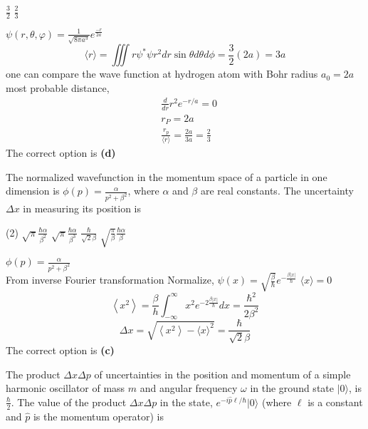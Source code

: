 \begin{enumerate}
\begin{tasks}
	\task[\textbf{C.}]$\frac{3}{2}$
	\task[\textbf{D.}]$\frac{2}{3}$
\end{tasks}
\begin{answer}
	$\psi(r, \theta, \varphi)=\frac{1}{\sqrt{8 \pi a^{3}}} e^{\frac{-r}{2 a}}$\\
	$$
	\langle r\rangle=\iiint r \psi^{*} \psi r^{2} d r \sin \theta d \theta d \phi=\frac{3}{2}(2 a)=3 a
	$$
	one can compare the wave function at hydrogen atom with Bohr radius $a_{0}=2 a$ most probable distance,\\
	\begin{align*}
		&\frac{d}{d r} r^{2} e^{-r / a}=0 \\
		&r_{P}=2 a \\
		&\frac{r_{p}}{\langle r\rangle}=\frac{2 a}{3 a}=\frac{2}{3}
	\end{align*}
	The correct option is \textbf{(d)}
\end{answer}
\begin{minipage}{\textwidth}
	\item The normalized wavefunction in the momentum space of a particle in one dimension is $\phi(p)=\frac{\alpha}{p^{2}+\beta^{2}}$, where $\alpha$ and $\beta$ are real constants. The uncertainty $\Delta x$ in measuring its position is
\end{minipage}
\begin{tasks}(2)
	\task[\textbf{A.}] $\sqrt{\pi} \frac{\hbar \alpha}{\beta^{2}}$
	\task[\textbf{B.}]$\sqrt{\pi} \frac{\hbar \alpha}{\beta^{3}}$
	\task[\textbf{C.}]$\frac{\hbar}{\sqrt{2} \beta}$
	\task[\textbf{D.}]$\sqrt{\frac{\pi}{\beta}} \frac{\hbar \alpha}{\beta}$
\end{tasks}
\begin{answer}
	$\phi(p)=\frac{\alpha}{p^{2}+\beta^{2}}$\\
	From inverse Fourier transformation
	Normalize, $\psi(x)=\sqrt{\frac{\beta}{\hbar}} e^{-\frac{\beta|x|}{\hbar}}$
	$\langle x\rangle=0$
	$$
	\left\langle x^{2}\right\rangle=\frac{\beta}{h} \int_{-\infty}^{\infty} x^{2} e^{-2 \frac{\beta|x|}{\hbar}} d x=\frac{\hbar^{2}}{2 \beta^{2}}
	$$
	$$
	\Delta x=\sqrt{\left\langle x^{2}\right\rangle-\langle x\rangle^{2}}=\frac{\hbar}{\sqrt{2} \beta}
	$$
	The correct option is \textbf{(c)}
\end{answer}
\begin{minipage}{\textwidth}
	\item The product $\Delta x \Delta p$ of uncertainties in the position and momentum of a simple harmonic oscillator of mass $m$ and angular frequency $\omega$ in the ground state $|0\rangle$, is $\frac{\hbar}{2}$. The value of the product $\Delta x \Delta p$ in the state, $e^{-i \hat{p} \ell / \hbar}|0\rangle$ (where $\ell$ is a constant and $\hat{p}$ is the momentum operator) is

\end{minipage}
\end{enumerate}
